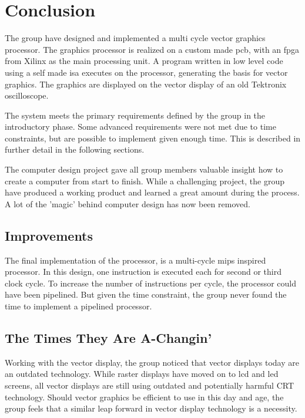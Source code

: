 \chapter{Conclusion}
The group have designed and implemented a multi cycle vector graphics processor.
The graphics processor is realized on a custom made \gls{pcb}, with an \gls{fpga} from Xilinx as the main processing unit.
A program written in low level code using a self made \gls{isa} executes on the processor, generating the basis for vector graphics.
The graphics are displayed on the vector display of an old Tektronix oscilloscope.

The system meets the primary requirements defined by the group in the introductory phase. 
Some advanced requirements were not met due to time constraints, but are possible to implement given enough time. 
This is described in further detail in the following sections.

The computer design project gave all group members valuable insight how to create a computer from start to finish.
While a challenging project, the group have produced a working product and learned a great amount during the process.
A lot of the 'magic' behind computer design has now been removed.

\section{Improvements}
The final implementation of the processor, is a multi-cycle mips inspired processor.
In this design, one instruction is executed each for second or third clock cycle.
To increase the number of instructions per cycle, the processor could have been pipelined.
But given the time constraint, the group never found the time to implement a pipelined processor.

\section{The Times They Are A-Changin'}
Working with the vector display, the group noticed that vector displays today are an outdated technology. 
While raster displays have moved on to \gls{lcd} and \gls{led} screens, all vector displays are still using outdated and potentially harmful CRT technology.
Should vector graphics be efficient to use in this day and age, the group feels that a similar leap forward in vector display technology is a necessity.